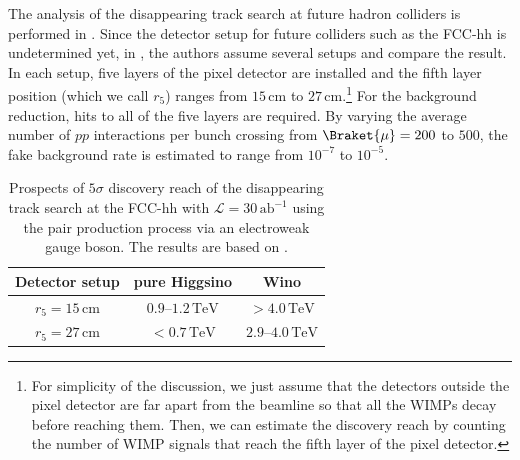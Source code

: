 \documentclass[12pt,twoside,book]{article}
\begin{document}
The analysis of the disappearing track search at future hadron colliders is performed in \cite{Han:2018wus, Saito:2019rtg}.
Since the detector setup for future colliders such as the FCC-hh is undetermined yet, in \cite{Saito:2019rtg}, the authors assume several setups and compare the result.
In each setup, five layers of the pixel detector are installed and the fifth layer position (which we call $r_5$) ranges from $15\, \mathrm{cm}$ to $27\, \mathrm{cm}$.\footnote
{
  For simplicity of the discussion, we just assume that the detectors outside the pixel detector are far apart from the beamline so that all the WIMPs decay before reaching them.
  Then, we can estimate the discovery reach by counting the number of WIMP signals that reach the fifth layer of the pixel detector.
}
For the background reduction, hits to all of the five layers are required.
By varying the average number of $pp$ interactions per bunch crossing from $\Braket{\mu} = 200$ to $500$, the fake background rate is estimated to range from $10^{-7}$ to $10^{-5}$.

\begin{table}[t]
  \centering
  \begin{tabular}{c|cc}
    Detector setup & pure Higgsino & Wino \\ \hline
    $r_5 = 15\,\mathrm{cm}$ & $0.9$--$1.2\,\mathrm{TeV}$ & $> 4.0\,\mathrm{TeV}$ \\
    $r_5 = 27\,\mathrm{cm}$ & $<0.7\,\mathrm{TeV}$ & $2.9$--$4.0\,\mathrm{TeV}$
  \end{tabular}
  \caption{
    Prospects of $5\sigma$ discovery reach of the disappearing track search at the FCC-hh with $\mathcal{L} = 30\,\mathrm{ab}^{-1}$ using the pair production process via an electroweak gauge boson.
    The results are based on \cite{Saito:2019rtg}.
  }
  \label{tab:disp_track_future}
\end{table}
\end{document}
